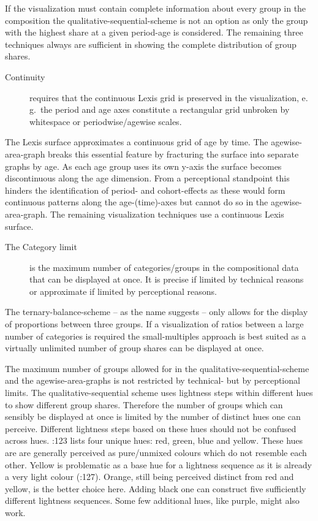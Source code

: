 \documentclass{scrartcl}
\begin{document}
If the visualization must contain complete information about every group in the composition the qualitative-sequential-scheme is not an option as only the group with the highest share at a given period-age is considered. The remaining three techniques always are sufficient in showing the complete distribution of group shares.

\begin{description}
  \item[Continuity] requires that the continuous Lexis grid is preserved in the visualization, e.\,g.~the period and age axes constitute a rectangular grid unbroken by whitespace or periodwise/agewise scales.
\end{description}

The Lexis surface approximates a continuous grid of age by time. The agewise-area-graph breaks this essential feature by fracturing the surface into separate graphs by age. As each age group uses its own y-axis the surface becomes discontinuous along the age dimension. From a perceptional standpoint this hinders the identification of period- and cohort-effects as these would form continuous patterns along the age-(time)-axes but cannot do so in the agewise-area-graph. The remaining visualization techniques use a continuous Lexis surface.

\begin{description}
  \item[The Category limit] is the maximum number of categories/groups in the compositional data that can be displayed at once. It is precise if limited by technical reasons or approximate if limited by perceptional reasons.
\end{description}

The ternary-balance-scheme -- as the name suggests -- only allows for the display of proportions between three groups. If a visualization of ratios between a large number of categories is required the small-multiples approach is best suited as a virtually unlimited number of group shares can be displayed at once.

The maximum number of groups allowed for in the qualitative-sequential-scheme and the agewise-area-graphs is not restricted by technical- but by perceptional limits. The qualitative-sequential scheme uses lightness steps within different hues to show different group shares. Therefore the number of groups which can sensibly be displayed at once is limited by the number of distinct hues one can perceive. Different lightness steps based on these hues should not be confused across hues. \textcite{Ware2013}:123 lists four unique hues: red, green, blue and yellow. These hues are are generally perceived as pure/unmixed colours which do not resemble each other. Yellow is problematic as a base hue for a lightness sequence as it is already a very light colour (\cite{Ware2013}:127). Orange, still being perceived distinct from red and yellow, is the better choice here. Adding black one can construct five sufficiently different lightness sequences. Some few additional hues, like purple, might also work.
\end{document}
